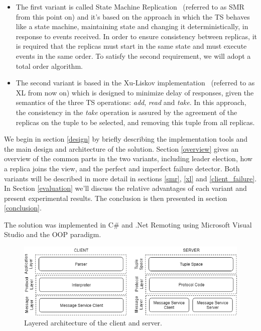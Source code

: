 \documentclass[times, 10pt,twocolumn]{article}
\begin{document}
\begin{itemize}
  \item The first variant is called State Machine Replication~\cite{Bakken:1995:SFP:203121.203132} 
  (referred to as SMR from this point on) and it's based on the approach in which the TS 
  behaves like a state machine, maintaining state and changing it deterministically, 
  in response to events received. In order to ensure consistency between replicas, it is required
  that the replicas must start in the same state and must execute events in the same order. 
  To satisfy the second requirement, we will adopt a total order algorithm.
  
  \item The second variant is based in the Xu-Liskov implementation~\cite{Xu1989ADF} (referred to as 
  XL from now on) which is designed to minimize delay of responses, given the semantics of the three TS
  operations: \textit{add}, \textit{read} and \textit{take}. In this approach, the consistency in the \textit{take} operation is assured
  by the agreement of the replicas on the tuple to be selected, and removing this tuple from all replicas.
\end{itemize}

We begin in section \ref{design} by briefly describing the implementation tools and the main 
design and architecture of the solution. Section \ref{overview} gives an overview of the common
parts in the two variants, including leader election, how a replica joins the view, and the perfect and 
imperfect failure detector. Both variants will be described in more detail in sections 
\ref{smr}, \ref{xl} and \ref{client_failure}. In Section \ref{evaluation} we'll discuss the relative advantages of each variant and present experimental results. The conclusion is then presented in section \ref{conclusion}.

 \label{design}

The solution was implemented in C\# and .Net Remoting using Microsoft Visual Studio and the 
OOP paradigm.

\begin{figure}[h]
\centering
\includegraphics[width=1\linewidth]{dad_architecture.png}
\caption{Layered architecture of the client and server.}
\label{fig:architecture}
\end{figure}
\end{document}
